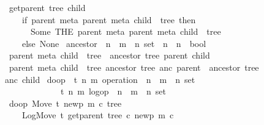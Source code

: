 \documentclass[sigplan,anonymous]{acmart}
\renewcommand{\isacartoucheopen}{}
\renewcommand{\isacartoucheclose}{}
\begin{document}
\begin{figure}
\begin{isabellebody}
\ \ {\isacartoucheopen}get{\isacharunderscore}parent\ tree\ child\ {\isasymequiv}\isanewline
\ \ \ \ \ if\ {\isasymexists}{\isacharbang}parent{\isachardot}\ {\isasymexists}{\isacharbang}meta{\isachardot}\ {\isacharparenleft}parent{\isacharcomma}\ meta{\isacharcomma}\ child{\isacharparenright}\ {\isasymin}\ tree\ then\isanewline
\ \ \ \ \ \ \ Some\ {\isacharparenleft}THE\ {\isacharparenleft}parent{\isacharcomma}\ meta{\isacharparenright}{\isachardot}\ {\isacharparenleft}parent{\isacharcomma}\ meta{\isacharcomma}\ child{\isacharparenright}\ {\isasymin}\ tree{\isacharparenright}\isanewline
\ \ \ \ \ else\ None{\isacartoucheclose}\isanewline
\isanewline
{}\isamarkupfalse%
\ ancestor\ {\isacharcolon}{\isacharcolon}\ {\isacartoucheopen}{\isacharparenleft}{\isacharprime}n\ {\isasymtimes}\ {\isacharprime}m\ {\isasymtimes}\ {\isacharprime}n{\isacharparenright}\ set\ {\isasymRightarrow}\ {\isacharprime}n\ {\isasymRightarrow}\ {\isacharprime}n\ {\isasymRightarrow}\ bool{\isacartoucheclose}\ \isanewline
\ \ {\isacartoucheopen}{\isasymlbrakk}{\isacharparenleft}parent{\isacharcomma}\ meta{\isacharcomma}\ child{\isacharparenright}\ {\isasymin}\ tree{\isasymrbrakk}\ {\isasymLongrightarrow}\ ancestor\ tree\ parent\ child{\isacartoucheclose}\ {\isacharbar}\isanewline
\ \ {\isacartoucheopen}{\isasymlbrakk}{\isacharparenleft}parent{\isacharcomma}\ meta{\isacharcomma}\ child{\isacharparenright}\ {\isasymin}\ tree{\isacharsemicolon}\ ancestor\ tree\ anc\ parent{\isasymrbrakk}\ {\isasymLongrightarrow}\ ancestor\ tree\ anc\ child{\isacartoucheclose}\isanewline
\isanewline
{}\isamarkupfalse%
\ do{\isacharunderscore}op\ {\isacharcolon}{\isacharcolon}\ {\isacartoucheopen}{\isacharparenleft}{\isacharprime}t{\isacharcomma}\ {\isacharprime}n{\isacharcomma}\ {\isacharprime}m{\isacharparenright}\ operation\ {\isasymtimes}\ {\isacharparenleft}{\isacharprime}n\ {\isasymtimes}\ {\isacharprime}m\ {\isasymtimes}\ {\isacharprime}n{\isacharparenright}\ set\ {\isasymRightarrow}\isanewline
\ \ \ \ \ \ \ \ \ \ \ \ \ \ {\isacharparenleft}{\isacharprime}t{\isacharcomma}\ {\isacharprime}n{\isacharcomma}\ {\isacharprime}m{\isacharparenright}\ log{\isacharunderscore}op\ {\isasymtimes}\ {\isacharparenleft}{\isacharprime}n\ {\isasymtimes}\ {\isacharprime}m\ {\isasymtimes}\ {\isacharprime}n{\isacharparenright}\ set{\isacartoucheclose}\ \isanewline
\ \ {\isacartoucheopen}do{\isacharunderscore}op\ {\isacharparenleft}Move\ t\ newp\ m\ c{\isacharcomma}\ tree{\isacharparenright}\ {\isacharequal}\isanewline
\ \ \ \ \ {\isacharparenleft}LogMove\ t\ {\isacharparenleft}get{\isacharunderscore}parent\ tree\ c{\isacharparenright}\ newp\ m\ c{\isacharcomma}\isanewline

\end{isabellebody}
\end{figure}
\end{document}
